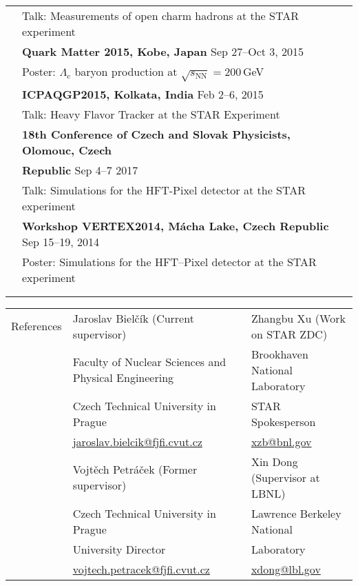 \documentclass[a4paper,11pt,oneside]{article}
\begin{document}
\begin{tabular}{@{} l l}
     & Talk: Measurements of open charm hadrons at the STAR experiment \\[.2cm]
     & \textbf{Quark Matter 2015, Kobe, Japan} Sep 27--Oct 3, 2015\\
     & Poster: $\Lambda_\mathrm{c}$ baryon production at $\sqrt{s_\mathrm{NN}} = 200\,$GeV \\[.2cm]
     & \textbf{ICPAQGP2015, Kolkata, India} Feb 2--6, 2015\\
     & Talk: Heavy Flavor Tracker at the STAR Experiment \\[.2cm]
     & \textbf{18th Conference of Czech and Slovak Physicists, Olomouc, Czech} \\
     & \textbf{Republic} Sep 4--7 2017 \\
     & Talk: Simulations for the HFT-Pixel detector at the STAR experiment\\[.2cm]
     & \textbf{Workshop VERTEX2014, Mácha Lake, Czech Republic} Sep 15--19, 2014\\
     & Poster: Simulations for the HFT–Pixel detector at the STAR experiment \\
     & \\
     \\
\end{tabular}

\noindent \begin{tabular}{@{} l l l}
 \Large{References} & Jaroslav Bielčík (Current supervisor)& Zhangbu Xu (Work on STAR ZDC) \\
 & Faculty of Nuclear Sciences and Physical Engineering &  Brookhaven National Laboratory  \\
 & Czech Technical University in Prague &  STAR Spokesperson \\
 & \small{\href{mailto:jaroslav.bielcik@fjfi.cvut.cz}{jaroslav.bielcik@fjfi.cvut.cz}} & \small{\href{mailto:xzb@bnl.gov}{xzb@bnl.gov}} \\[.2cm]
 & Vojtěch Petráček (Former supervisor)  &  Xin Dong (Supervisor at LBNL) \\
 & Czech Technical University in Prague  &  Lawrence Berkeley National \\
 & University Director &  Laboratory \\
 & \small{\href{mailto:vojtech.petracek@fjfi.cvut.cz}{vojtech.petracek@fjfi.cvut.cz}} & \small{\href{mailto:xdong@lbl.gov}{xdong@lbl.gov}} \\
\end{tabular}
\end{document}
